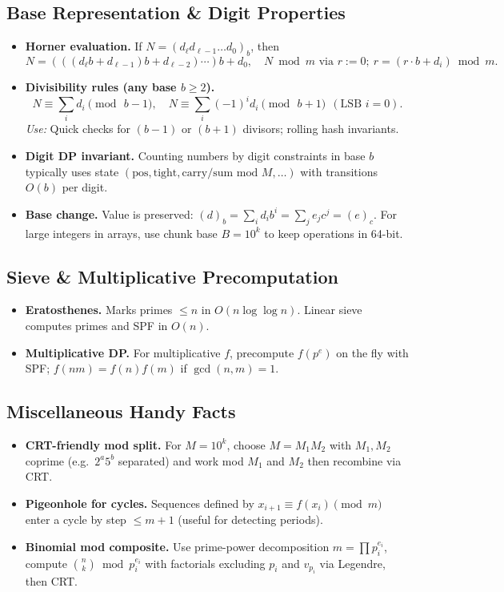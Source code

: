 \documentclass[10pt]{article}
\theoremstyle{definition}
\begin{document}
\subsection{Base Representation \& Digit Properties}
\begin{itemize}
  \item \textbf{Horner evaluation.} If $N=(d_\ell d_{\ell-1}\dots d_0)_b$, then
  \[
    N = (((d_\ell b + d_{\ell-1})b + d_{\ell-2})\cdots)b + d_0, \quad
    N \bmod m \text{ via } r:=0;\ r=(r\cdot b + d_i)\bmod m.
  \]
  \item \textbf{Divisibility rules (any base $b\ge 2$).}
  \[
    N \equiv \sum_i d_i \pmod{\,b-1},\quad
    N \equiv \sum_i (-1)^i d_i \pmod{\,b+1}\ \ (\text{LSB }i=0).
  \]
  \emph{Use:} Quick checks for $(b-1)$ or $(b+1)$ divisors; rolling hash invariants.
  \item \textbf{Digit DP invariant.} Counting numbers by digit constraints in base $b$ typically uses state $(\text{pos},\text{tight},\text{carry/sum mod }M,\dots)$ with transitions $O(b)$ per digit.
  \item \textbf{Base change.} Value is preserved: $(d)_b=\sum_i d_i b^i=\sum_j e_j c^j = (e)_c$. For large integers in arrays, use chunk base $B=10^k$ to keep operations in 64-bit.
\end{itemize}

\subsection{Sieve \& Multiplicative Precomputation}
\begin{itemize}
  \item \textbf{Eratosthenes.} Marks primes $\le n$ in $O(n\log\log n)$. Linear sieve computes primes and SPF in $O(n)$.
  \item \textbf{Multiplicative DP.} For multiplicative $f$, precompute $f(p^e)$ on the fly with SPF; $f(nm)=f(n)f(m)$ if $\gcd(n,m)=1$.
\end{itemize}

\subsection{Miscellaneous Handy Facts}
\begin{itemize}
  \item \textbf{CRT-friendly mod split.} For $M=10^k$, choose $M=M_1M_2$ with $M_1,M_2$ coprime (e.g.\ $2^a5^b$ separated) and work mod $M_1$ and $M_2$ then recombine via CRT.
  \item \textbf{Pigeonhole for cycles.} Sequences defined by $x_{i+1}\equiv f(x_i)\pmod m$ enter a cycle by step $\le m+1$ (useful for detecting periods).
  \item \textbf{Binomial mod composite.} Use prime-power decomposition $m=\prod p_i^{e_i}$, compute $\binom{n}{k}\bmod p_i^{e_i}$ with factorials excluding $p_i$ and $v_{p_i}$ via Legendre, then CRT.
\end{itemize}
\end{document}
